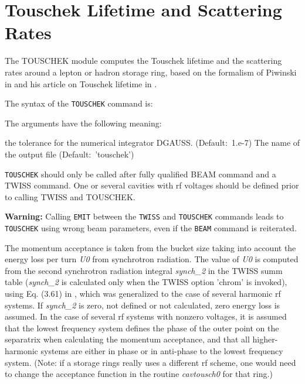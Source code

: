 
\chapter{Touschek Lifetime and Scattering Rates}

The TOUSCHEK module computes the Touschek lifetime and the scattering
rates around a lepton or hadron storage ring, based on the formalism of
Piwinski in \cite{Piwinski1998} and his article on Touschek lifetime in
\cite{chaotigner1999}.

The syntax of the \texttt{TOUSCHEK} command is: 

The arguments have the following meaning: 
\begin{madlist}
    the tolerance for the numerical integrator
   DGAUSS. (Default:~1.e-7) 
    The name of the output file (Default:~'touschek') 
\end{madlist}

\texttt{TOUSCHEK} should only be called after fully qualified BEAM
command and a TWISS command. One or several cavities with rf voltages
should be defined prior to calling TWISS and TOUSCHEK. 

\textbf{Warning:} Calling \texttt{EMIT} between the \texttt{TWISS} and
\texttt{TOUSCHEK} commands leads to \texttt{TOUSCHEK} using wrong beam
parameters, even if the \texttt{BEAM} command is reiterated.  
 
The momentum acceptance is taken from the bucket size taking into
account the  energy loss per turn \textit{U0} from synchrotron
radiation. The value of \textit{U0} is computed from the second
synchrotron radiation integral \textit{synch\_2} in the TWISS summ table
(\textit{synch\_2} is calculated only when the TWISS option 'chrom' is
invoked), using Eq. (3.61) in \cite{sands1970}, which was
generalized to the case of several harmonic rf systems. 
If \textit{synch\_2} is zero, not defined or not calculated, zero energy
loss is assumed. In the case of several rf systems with nonzero
voltages, it is assumed that the lowest frequency system defines the
phase of the outer point on the separatrix when calculating the momentum
acceptance, and that all higher-harmonic systems are either in phase or
in anti-phase to the lowest frequency system. (Note: if a storage rings
really uses a different rf scheme, one would need to change the
acceptance function in the routine \textit{cavtousch0} for that ring.) 



